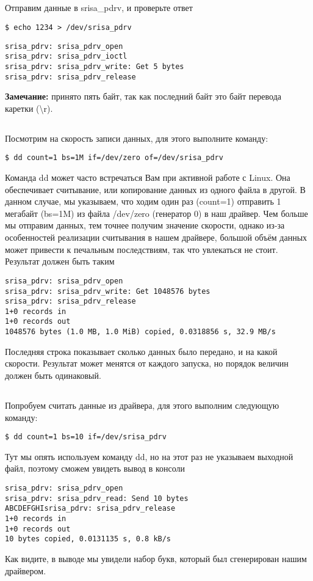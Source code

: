 \subsection{}Отправим данные в srisa\_pdrv, и проверьте ответ
\begin{lstlisting}[style=bash]
$ echo 1234 > /dev/srisa_pdrv
\end{lstlisting}
\begin{lstlisting}[style=stdout]
srisa_pdrv: srisa_pdrv_open
srisa_pdrv: srisa_pdrv_ioctl
srisa_pdrv: srisa_pdrv_write: Get 5 bytes
srisa_pdrv: srisa_pdrv_release
\end{lstlisting}
\textbf{Замечание:} принято пять байт, так как последний байт это байт перевода каретки (\textbackslash{}r). 

\subsection{}Посмотрим на скорость записи данных, для этого выполните команду:
\begin{lstlisting}[style=bash]
$ dd count=1 bs=1M if=/dev/zero of=/dev/srisa_pdrv 
\end{lstlisting}
Команда dd может часто встречаться Вам при активной работе с Linux. Она обеспечивает считывание, или копирование данных из одного файла в другой. В данном случае, мы указываем, что ходим один раз (count=1) отправить 1 мегабайт (bs=1M)  из файла /dev/zero (генератор 0) в наш драйвер. Чем больше мы отправим данных, тем точнее получим значение скорости, однако из-за особенностей реализации считывания в нашем драйвере, большой объём данных может привести к печальным последствиям, так что увлекаться не стоит. Результат должен быть таким
\begin{lstlisting}[style=stdout]
srisa_pdrv: srisa_pdrv_open
srisa_pdrv: srisa_pdrv_write: Get 1048576 bytes
srisa_pdrv: srisa_pdrv_release 
1+0 records in
1+0 records out
1048576 bytes (1.0 MB, 1.0 MiB) copied, 0.0318856 s, 32.9 MB/s
\end{lstlisting}
Последняя строка показывает сколько данных было передано, и на какой скорости. Результат может менятся от каждого запуска, но порядок величин должен быть одинаковый.

\subsection{}Попробуем считать данные из драйвера, для этого выполним следующую команду: 
\begin{lstlisting}[style=bash]
$ dd count=1 bs=10 if=/dev/srisa_pdrv
\end{lstlisting}
Тут мы опять используем команду dd, но на этот раз не указываем выходной файл, поэтому сможем увидеть вывод в консоли
\begin{lstlisting}[style=stdout]
srisa_pdrv: srisa_pdrv_open 
srisa_pdrv: srisa_pdrv_read: Send 10 bytes 
ABCDEFGHIsrisa_pdrv: srisa_pdrv_release 
1+0 records in 
1+0 records out 
10 bytes copied, 0.0131135 s, 0.8 kB/s
\end{lstlisting}
Как видите, в выводе мы увидели набор букв, который был сгенерирован нашим драйвером.  

